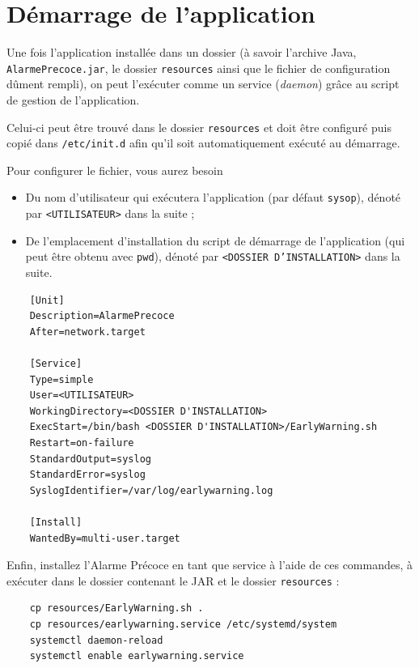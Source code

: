 \documentclass{article}
\begin{document}
\pagebreak
\section{Démarrage de l'application}

Une fois l'application installée dans un dossier (à savoir l'archive Java, \texttt{AlarmePrecoce.jar}, le dossier \texttt{resources} ainsi que le fichier de configuration dûment rempli), on peut l'exécuter comme un service (\emph{daemon}) grâce au script de gestion de l'application. 

Celui-ci peut être trouvé dans le dossier \texttt{resources} et doit être configuré puis copié dans \texttt{/etc/init.d} afin qu'il soit automatiquement exécuté au démarrage.

Pour configurer le fichier, vous aurez besoin 

\begin{itemize}
    \item Du nom d'utilisateur qui exécutera l'application (par défaut \texttt{sysop}), dénoté par \texttt{<UTILISATEUR>} dans la suite ;
    \item De l'emplacement d'installation du script de démarrage de l'application (qui peut être obtenu avec \texttt{pwd}), dénoté par \texttt{<DOSSIER D'INSTALLATION>} dans la suite.
\end{itemize}

\begin{verbatim}
    [Unit] 
    Description=AlarmePrecoce
    After=network.target 
     
    [Service] 
    Type=simple 
    User=<UTILISATEUR>
    WorkingDirectory=<DOSSIER D'INSTALLATION>
    ExecStart=/bin/bash <DOSSIER D'INSTALLATION>/EarlyWarning.sh 
    Restart=on-failure  
    StandardOutput=syslog 
    StandardError=syslog 
    SyslogIdentifier=/var/log/earlywarning.log 
    
    [Install] 
    WantedBy=multi-user.target
\end{verbatim}

Enfin, installez l'Alarme Précoce en tant que service à l'aide de ces commandes, à exécuter dans le dossier contenant le JAR et le dossier \texttt{resources} :

\begin{verbatim}
    cp resources/EarlyWarning.sh .
    cp resources/earlywarning.service /etc/systemd/system
    systemctl daemon-reload
    systemctl enable earlywarning.service
\end{verbatim}
\end{document}
